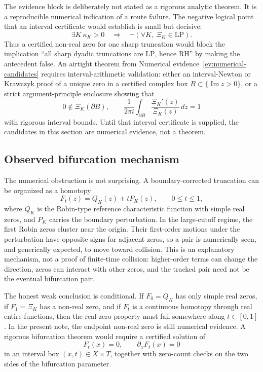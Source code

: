\documentclass[11pt]{article}
\newcommand{\RH}{\mathrm{RH}}
\newcommand{\LP}{\mathrm{LP}}
\newcommand{\dd}{\,d}
\begin{document}
The evidence block is deliberately not stated as a rigorous analytic theorem.
It is a reproducible numerical indication of a route failure.  The negative
logical point that an interval certificate would establish is small but
decisive:
$$
  \exists K\ \kappa_K>0
  \quad\Longrightarrow\quad
  \neg(\forall K,\ \Xi_K\in\LP).
$$
Thus a certified non-real zero for one sharp truncation would block the
implication ``all sharp dyadic truncations are $\LP$, hence $\RH$'' by making
the antecedent false.  An airtight theorem from Numerical
evidence~\ref{ev:numerical-candidates} requires interval-arithmetic validation:
either an
interval-Newton or Krawczyk proof of a unique zero in a certified complex box
$B\subset\{\operatorname{Im}z>0\}$, or a strict argument-principle enclosure
showing that
$$
  0\notin \Xi_K(\partial B),
  \qquad
  \frac{1}{2\pi i}\int_{\partial B}\frac{\Xi_K'(z)}{\Xi_K(z)}\dd z=1
$$
with rigorous interval bounds.  Until that interval certificate is supplied,
the candidates in this section are numerical evidence, not a theorem.

\subsection{Observed bifurcation mechanism}

The numerical obstruction is not surprising.  A boundary-corrected truncation
can be organized as a homotopy
$$
  F_t(z)=Q_K(z)+tP_K(z),\qquad 0\leq t\leq 1,
$$
where $Q_K$ is the Robin-type reference characteristic function with simple
real zeros, and $P_K$ carries the boundary perturbation.  In the large-cutoff
regime, the first Robin zeros cluster near the origin.  Their first-order
motions under the perturbation have opposite signs for adjacent zeros, so a
pair is numerically seen, and generically expected, to move toward collision.
This is an explanatory mechanism, not a proof of finite-time collision:
higher-order terms can change the direction, zeros can interact with other
zeros, and the tracked pair need not be the eventual bifurcation pair.

The honest weak conclusion is conditional.  If $F_0=Q_K$ has only simple real
zeros, if $F_1=\Xi_K$ has a non-real zero, and if $F_t$ is a continuous
homotopy through real entire functions, then the real-zero property must fail
somewhere along $t\in[0,1]$.  In the present note, the endpoint non-real zero
is still numerical evidence.  A rigorous bifurcation theorem would require a
certified solution of
$$
  F_t(x)=0,\qquad \partial_xF_t(x)=0
$$
in an interval box $(x,t)\in X\times T$, together with zero-count checks on
the two sides of the bifurcation parameter.
\end{document}
